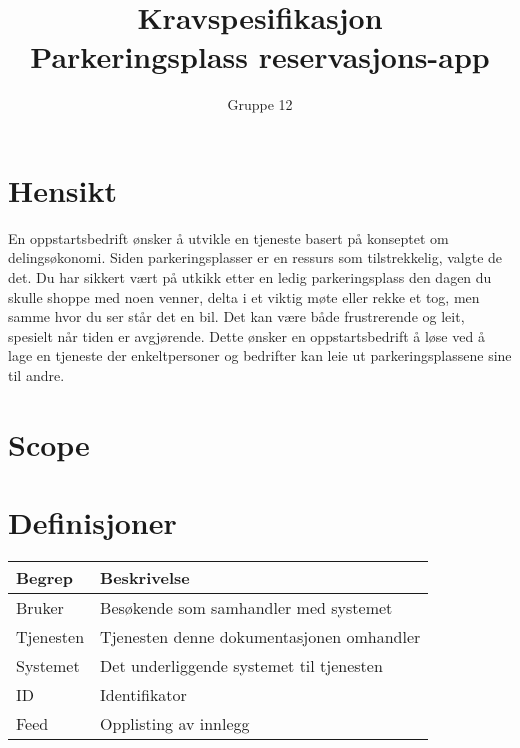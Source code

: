 \documentclass[12pt]{article}
\begin{document}
\title{%
    Kravspesifikasjon\\
    \large Parkeringsplass reservasjons-app }
\author{Gruppe 12}
\date{}
\maketitle

\newpage

\tableofcontents

\newpage

\section{Hensikt}
En oppstartsbedrift ønsker å utvikle en tjeneste basert på konseptet om delingsøkonomi. Siden parkeringsplasser er en ressurs som tilstrekkelig, valgte de det. Du har sikkert vært på utkikk etter en ledig parkeringsplass den dagen du skulle shoppe med noen venner, delta i et viktig møte eller rekke et tog, men samme hvor du ser står det en bil. Det kan være både frustrerende og leit, spesielt når tiden er avgjørende. Dette ønsker en oppstartsbedrift å løse ved å lage en tjeneste der enkeltpersoner og bedrifter kan leie ut parkeringsplassene sine til andre.

\section{Scope}

\section{Definisjoner}

\begin{center}
    \begin{tabular}{|p{4cm}|p{12cm}| } 
        \hline
        \bf Begrep & \bf Beskrivelse \\
        \hline
        Bruker & Besøkende som samhandler med systemet \\
        \hline
        Tjenesten & Tjenesten denne dokumentasjonen omhandler \\
        \hline
        Systemet & Det underliggende systemet til tjenesten \\
        \hline
        ID & Identifikator \\
        \hline
        Feed & Opplisting av innlegg \\
        \hline
    \end{tabular}
\end{center}
\end{document}

